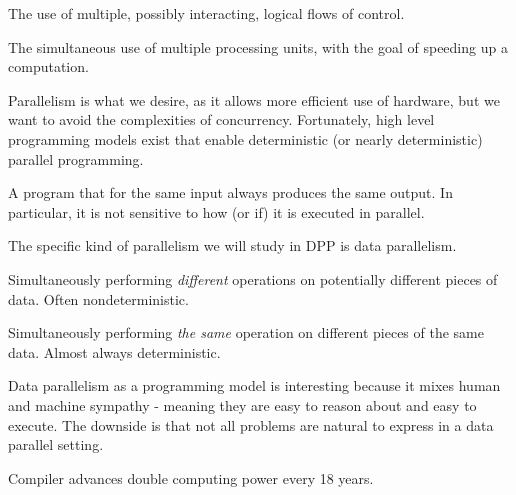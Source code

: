 \begin{definition}[Concurrency]
  The use of multiple, possibly interacting, logical flows of control.
\end{definition}

\begin{definition}[Parallelism]
  The simultaneous use of multiple processing units, with the goal of
  speeding up a computation.
\end{definition}

Parallelism is what we desire, as it allows more efficient use of
hardware, but we want to avoid the complexities of concurrency.
Fortunately, high level programming models exist that enable
deterministic (or nearly deterministic) parallel programming.

\begin{definition}
  A program that for the same input always produces the same output.
  In particular, it is not sensitive to how (or if) it is executed in
  parallel.
\end{definition}

The specific kind of parallelism we will study in DPP is data
parallelism.

\begin{definition}
  Simultaneously performing \textit{different} operations on potentially
  different pieces of data.  Often nondeterministic.
\end{definition}

\begin{definition}
  Simultaneously performing \textit{the same} operation on different
  pieces of the same data.  Almost always deterministic.
\end{definition}

Data parallelism as a programming model is interesting because it
mixes human and machine sympathy - meaning they are easy to reason
about and easy to execute. The downside is that not all problems are
natural to express in a data parallel setting.

\begin{definition}
  Compiler advances double computing power every 18 years.
\end{definition}

